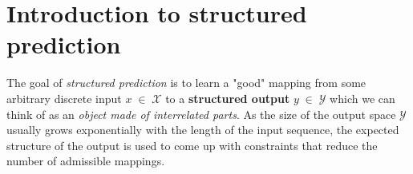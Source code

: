 



\maketitle

\section{Introduction to structured prediction}
The goal of \textit{structured prediction} is to learn a "good" mapping from
some arbitrary discrete input $x \; \in \; \mathcal{X}$ to a \textbf{structured
output} $ y \; \in \; \mathcal{Y}$ which we can think of as an \textit{object
made of interrelated parts}. As the size of the output space $\mathcal{Y}$
usually grows exponentially with the length of the input sequence, the expected
structure of the output is used to come up with constraints that reduce the
number of admissible mappings.

